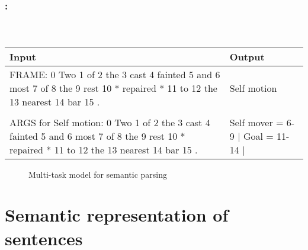 \documentclass[xcolor=table]{beamer}
\begin{document}
\begin{frame}
	\frametitle{\insertshortsubtitle: \insertsection}
	\framesubtitle{\insertsubsection\ \cite{2020-kalyanpur}}
	
	\begin{minipage}{.58\textwidth}
		\small
		\begin{tabular}{|p{4cm}|p{2cm}|}
			\hline
			Input & Output \\
			\hline
			FRAME: 0 Two 1 of 2 the 3 cast 4
			fainted 5 and 6 most 7 of 8 the 9 rest
			10 * repaired * 11 to 12 the 13 nearest
			14 bar 15 . & Self motion\\
			&\\
			ARGS for Self motion: 0 Two 1 of 2 the
			3 cast 4 fainted 5 and 6 most 7 of 8 the
			9 rest 10 * repaired * 11 to 12 the 13
			nearest 14 bar 15 . & Self mover = 6-9 $|$ Goal = 11-14 $|$\\
			\hline
		\end{tabular}
	\end{minipage}
	\begin{minipage}{.4\textwidth}
		\begin{figure}
			\caption{Multi-task model for semantic parsing \cite{2020-kalyanpur}}
		\end{figure}
	\end{minipage}
	
\end{frame}

\section{Semantic representation of sentences}
\end{document}
